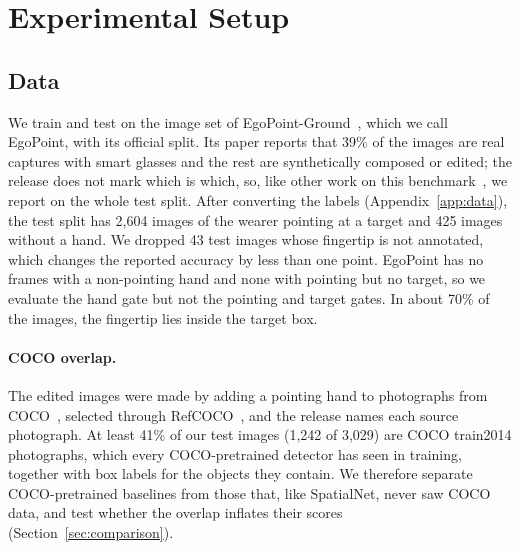\section{Experimental Setup}\label{sec:setup}

\subsection{Data}\label{sec:data}
We train and test on the image set of EgoPoint-Ground~\cite{egopoint}, which we call EgoPoint, with its official split. Its paper reports that 39\% of the images are real captures with smart glasses and the rest are synthetically composed or edited; the release does not mark which is which, so, like other work on this benchmark~\cite{li2026vistaref,li2026pointvgr}, we report on the whole test split. After converting the labels (Appendix~\ref{app:data}), the test split has 2,604 images of the wearer pointing at a target and 425 images without a hand. We dropped 43 test images whose fingertip is not annotated, which changes the reported accuracy by less than one point. EgoPoint has no frames with a non-pointing hand and none with pointing but no target, so we evaluate the hand gate but not the pointing and target gates. In about 70\% of the images, the fingertip lies inside the target box.

\paragraph{COCO overlap.} The edited images were made by adding a pointing hand to photographs from COCO~\cite{lin2014coco}, selected through RefCOCO~\cite{yu2016modeling}, and the release names each source photograph. At least 41\% of our test images (1,242 of 3,029) are COCO train2014 photographs, which every COCO-pretrained detector has seen in training, together with box labels for the objects they contain. We therefore separate COCO-pretrained baselines from those that, like SpatialNet, never saw COCO data, and test whether the overlap inflates their scores (Section~\ref{sec:comparison}).

